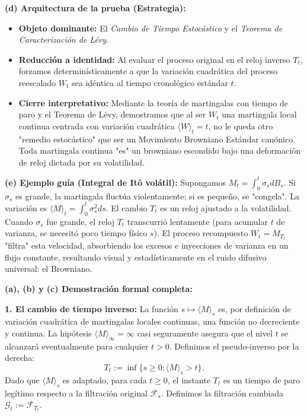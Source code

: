 \documentclass[11pt, letterpaper]{article}
\begin{document}
\vspace{5mm}

\begin{solucion}
    \textbf{(d) Arquitectura de la prueba (Estrategia):}
    \begin{itemize}
        \item[(i)] \textbf{Objeto dominante:} El \textit{Cambio de Tiempo Estocástico} y el \textit{Teorema de Caracterización de Lévy}.
        \item[(ii)] \textbf{Reducción a identidad:} Al evaluar el proceso original en el reloj inverso $T_t$, forzamos determinísticamente a que la variación cuadrática del proceso reescalado $W_t$ sea idéntica al tiempo cronológico estándar $t$.
        \item[(iii)] \textbf{Cierre interpretativo:} Mediante la teoría de martingalas con tiempo de paro y el Teorema de Lévy, demostramos que al ser $W_t$ una martingala local continua centrada con variación cuadrática $\langle W \rangle_t = t$, no le queda otro "remedio estocástico" que ser un Movimiento Browniano Estándar canónico. Toda martingala continua "es" un browniano escondido bajo una deformación de reloj dictada por su volatilidad.
    \end{itemize}

    \vspace{3mm}
    \textbf{(e) Ejemplo guía (Integral de Itô volátil):}
    Supongamos $M_t = \int_0^t \sigma_s dB_s$. Si $\sigma_s$ es grande, la martingala fluctúa violentamente; si es pequeño, se "congela". La variación es $\langle M \rangle_t = \int_0^t \sigma_s^2 ds$.
    El cambio $T_t$ es un reloj ajustado a la volatilidad. Cuando $\sigma_s$ fue grande, el reloj $T_t$ transcurrió lentamente (para acumular $t$ de varianza, se necesitó poco tiempo físico $s$). El proceso recompuesto $W_t = M_{T_t}$ "filtra" esta velocidad, absorbiendo los excesos e inyecciones de varianza en un flujo constante, resultando visual y estadísticamente en el ruido difusivo universal: el Browniano.

    \textbf{(a), (b) y (c) Demostración formal completa:}

    \textbf{1. El cambio de tiempo inverso:}
    La función $s \mapsto \langle M \rangle_s$ es, por definición de variación cuadrática de martingalas locales continuas, una función no decreciente y continua.
    La hipótesis $\langle M \rangle_\infty = \infty$ casi seguramente asegura que el nivel $t$ se alcanzará eventualmente para cualquier $t > 0$.
    Definimos el pseudo-inverso por la derecha:
    \[ T_t := \inf\{s \ge 0 : \langle M \rangle_s > t\}. \]
    Dado que $\langle M \rangle_s$ es adaptado, para cada $t \ge 0$, el instante $T_t$ es un tiempo de paro legítimo respecto a la filtración original $\mathcal{F}_s$. Definimos la filtración cambiada $\mathcal{G}_t := \mathcal{F}_{T_t}$.


\end{solucion}
\end{document}
